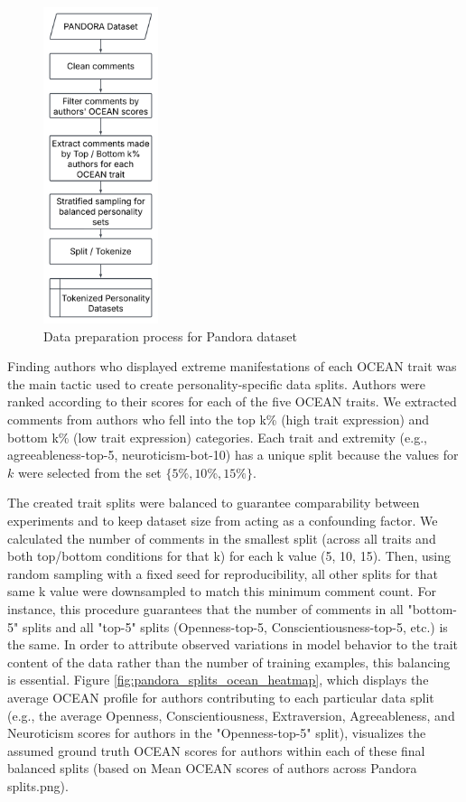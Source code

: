 \documentclass{DESSThesis}
\begin{document}
\begin{figure}[H]
    \centering
    \includegraphics[width=0.3\textwidth]{img/pandora_flowchart.png}
    \caption{Data preparation process for Pandora dataset}
    \label{fig:pandora_flowchart}
\end{figure}

Finding authors who displayed extreme manifestations of each OCEAN trait was the main tactic used to create personality-specific data splits. Authors were ranked according to their scores for each of the five OCEAN traits. We extracted comments from authors who fell into the top k\% (high trait expression) and bottom k\% (low trait expression) categories. Each trait and extremity (e.g., agreeableness-top-5, neuroticism-bot-10) has a unique split because the values for \(k\) were selected from the set \(\{5\%, 10\%, 15\%\}\).

The created trait splits were balanced to guarantee comparability between experiments and to keep dataset size from acting as a confounding factor. We calculated the number of comments in the smallest split (across all traits and both top/bottom conditions for that k) for each k value (5, 10, 15). Then, using random sampling with a fixed seed for reproducibility, all other splits for that same k value were downsampled to match this minimum comment count. For instance, this procedure guarantees that the number of comments in all "bottom-5" splits and all "top-5" splits (Openness-top-5, Conscientiousness-top-5, etc.) is the same. In order to attribute observed variations in model behavior to the trait content of the data rather than the number of training examples, this balancing is essential. Figure \ref{fig:pandora_splits_ocean_heatmap}, which displays the average OCEAN profile for authors contributing to each particular data split (e.g., the average Openness, Conscientiousness, Extraversion, Agreeableness, and Neuroticism scores for authors in the "Openness-top-5" split), visualizes the assumed ground truth OCEAN scores for authors within each of these final balanced splits (based on Mean OCEAN scores of authors across Pandora splits.png).
\end{document}
